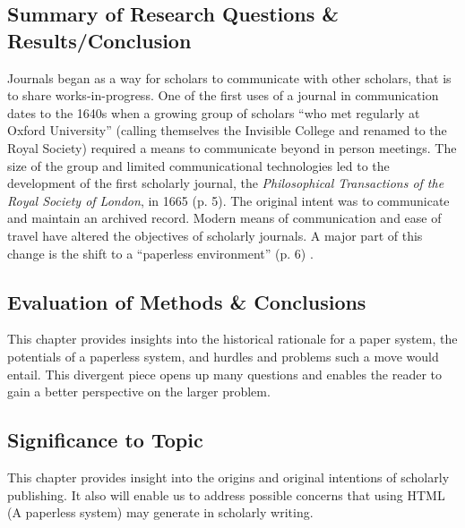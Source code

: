 \documentclass[leavefloats]{apa6e}\usepackage[]{graphicx}\usepackage[]{color}
\begin{document}
\regpar



\subsection{Summary of Research Questions \& Results/Conclusion} %
Journals began as a way for scholars to communicate with other scholars, that is to share works-in-progress.  One of the first uses of a journal in communication dates to the 1640s when a growing group of scholars ``who met regularly at Oxford University'' (calling themselves the Invisible College and renamed to the Royal Society) required a means to communicate beyond in person meetings.  The size of the group and limited communicational technologies led to the development of the first scholarly journal, the \emph{Philosophical Transactions of the Royal Society of London}, in 1665 (p. 5).  The original intent was to communicate and maintain an archived record.  Modern means of communication and ease of travel have altered the objectives of scholarly journals.  A major part of this change is the shift to a ``paperless environment'' (p. 6) .  

\subsection{Evaluation of Methods \& Conclusions} %
This chapter provides insights into the historical rationale for a paper system, the potentials of a paperless system, and hurdles and problems such a move would entail.  This divergent piece opens up many questions and enables the reader to gain a better perspective on the larger problem.

\subsection{Significance to Topic} %
This chapter provides insight into the origins and original intentions of scholarly publishing.  It also will enable us to address possible concerns that using HTML (A paperless system) may generate in scholarly writing.


 \section{\textcite{Pierce2012}}
\end{document}
